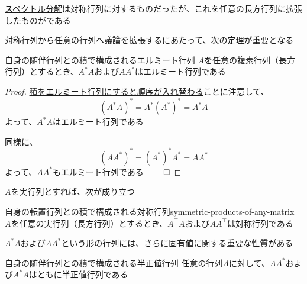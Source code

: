 \documentclass[../../../topic_linear-algebra]{subfiles}
\begin{document}
\hyperref[thm:spectral-decomposition-symmetric]{スペクトル分解}は対称行列に対するものだったが、これを任意の長方行列に拡張したものがである

\br

対称行列から任意の行列へ議論を拡張するにあたって、次の定理が重要となる

\begin{theorem*}{自身の随伴行列との積で構成されるエルミート行列}
  $A$を任意の複素行列（長方行列）とするとき、$A^* A$および$AA^*$はエルミート行列である
\end{theorem*}

\begin{proof}
  \hyperref[thm:adjoint-of-product]{積をエルミート行列にすると順序が入れ替わる}ことに注意して、
  \begin{equation*}
    (A^* A)^* = A^* (A^*)^* = A^* A
  \end{equation*}
  よって、$A^* A$はエルミート行列である

  \br

  同様に、
  \begin{equation*}
    (AA^*)^* = (A^*)^* A^* = AA^*
  \end{equation*}
  よって、$AA^*$もエルミート行列である $\qed$
\end{proof}

\br

$A$を実行列とすれば、次が成り立つ

\begin{theorem}{自身の転置行列との積で構成される対称行列}{symmetric-products-of-any-matrix}
  $A$を任意の実行列（長方行列）とするとき、$A^\top A$および$AA^\top$は対称行列である
\end{theorem}

\sectionline

$A^* A$および$AA^*$という形の行列には、さらに固有値に関する重要な性質がある

\begin{theorem*}{自身の随伴行列との積で構成される半正値行列}
  任意の行列$A$に対して、$AA^*$および$A^*A$はともに半正値行列である
\end{theorem*}
\end{document}
